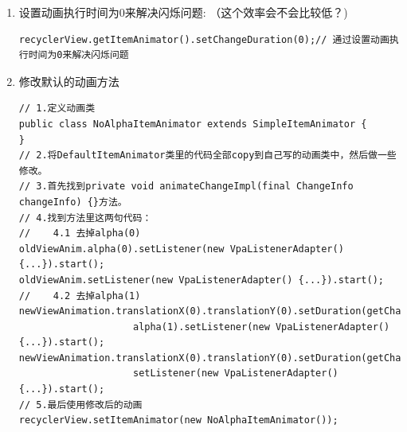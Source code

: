 \documentclass[9pt, b5paper]{article}
\begin{document}
\begin{enumerate}
\begin{enumerate}
\begin{verbatim}
     * The value of this property is true by default.
     *
     */
    public void setSupportsChangeAnimations(boolean supportsChangeAnimations) {
        mSupportsChangeAnimations = supportsChangeAnimations;
    }
\end{verbatim}
\begin{itemize}
\item 只要设置为false，就可以不显示动画了，也就解决了闪烁问题。 关键代码：
\end{itemize}
\begin{verbatim}
((SimpleItemAnimator)recyclerView.getItemAnimator()).setSupportsChangeAnimations(false);
\end{verbatim}
\item 设置动画执行时间为0来解决闪烁问题: （这个效率会不会比较低？)
\label{sec-5-3-5-1-3}
\begin{verbatim}
recyclerView.getItemAnimator().setChangeDuration(0);// 通过设置动画执行时间为0来解决闪烁问题
\end{verbatim}
\item 修改默认的动画方法
\label{sec-5-3-5-1-4}
\begin{verbatim}
// 1.定义动画类
public class NoAlphaItemAnimator extends SimpleItemAnimator {
}
// 2.将DefaultItemAnimator类里的代码全部copy到自己写的动画类中，然后做一些修改。
// 3.首先找到private void animateChangeImpl(final ChangeInfo changeInfo) {}方法。
// 4.找到方法里这两句代码：
//    4.1 去掉alpha(0)
oldViewAnim.alpha(0).setListener(new VpaListenerAdapter() {...}).start();
oldViewAnim.setListener(new VpaListenerAdapter() {...}).start();
//    4.2 去掉alpha(1)
newViewAnimation.translationX(0).translationY(0).setDuration(getChangeDuration()).
                    alpha(1).setListener(new VpaListenerAdapter() {...}).start();
newViewAnimation.translationX(0).translationY(0).setDuration(getChangeDuration()).
                    setListener(new VpaListenerAdapter() {...}).start();
// 5.最后使用修改后的动画
recyclerView.setItemAnimator(new NoAlphaItemAnimator());
\end{verbatim}
\end{enumerate}
\end{enumerate}
\end{document}
